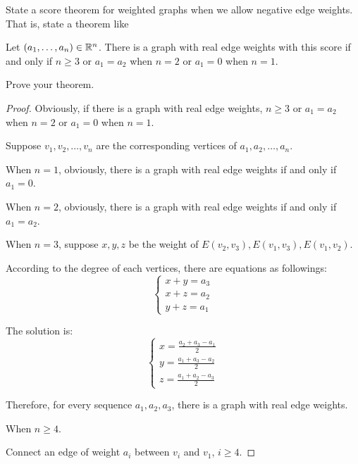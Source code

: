 
\begin{exercise}
  State a score theorem for weighted graphs when we allow
  negative edge weights. That is, state a theorem like
  \begin{theorem}
     Let $(a_1,\dots,a_n) \in \mathbb{R}^n$. There is a  graph with real edge weights
     with this score if and only if $n \geq 3$ or $a_1 = a_2$ when $n=2$ or $a_1 = 0$ when $n=1$.
  \end{theorem}  
\end{exercise}

\begin{exercise}
Prove your theorem.
    \begin{proof}

        Obviously, if there is a graph with real edge weights, $n \geq 3$ or $a_1 = a_2$ when $n=2$ or $a_1 = 0$ when $n=1$.

        Suppose $v_1, v_2 , \dots, v_n$ are the corresponding vertices of $a_1, a_2, \dots, a_n$.

        When $n=1$, obviously, there is a graph with real edge weights if and only if $a_1=0$.

        When $n=2$, obviously, there is a graph with real edge weights if and only if $a_1=a_2$.

        When $n=3$, suppose $x, y, z$ be the weight of $E(v_2, v_3), E(v_1, v_3), E(v_1, v_2)$.

        According to the degree of each vertices, there are equations as followings:
        $$
        \begin{cases}
            x + y = a_3 \\
            x + z = a_2 \\
            y + z = a_1
        \end{cases}
        $$

        The solution is:
        $$
        \begin{cases}
            x = \frac{a_2 + a_3 - a_1}{2} \\
            y = \frac{a_1 + a_3 - a_2}{2} \\
            z = \frac{a_1 + a_2 - a_3}{2}
        \end{cases}
        $$

        Therefore, for every sequence $a_1, a_2, a_3$, there is a graph with real edge weights.

        When $n \geq 4$.

        Connect an edge of weight $a_i$ between $v_i$ and $v_1$, $i \geq 4$.


\end{proof}
\end{exercise}
